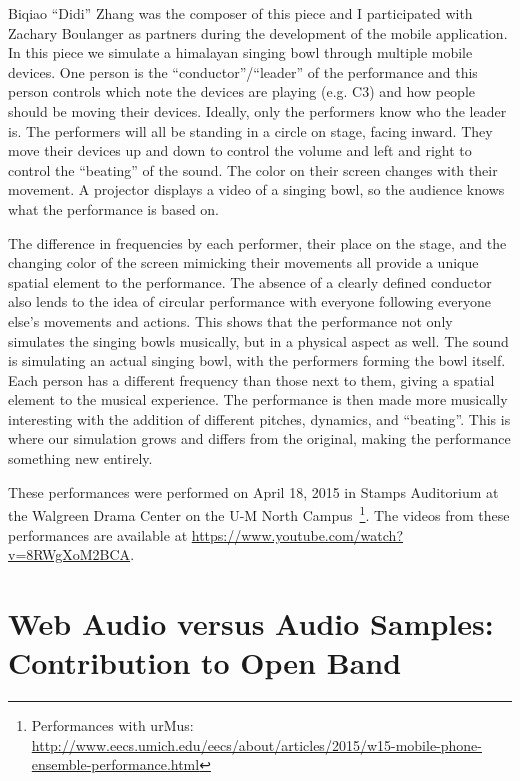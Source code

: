 Biqiao ``Didi'' Zhang was the composer of this piece and I participated with Zachary Boulanger as partners during the development of the mobile application.  
In this piece we simulate a himalayan singing bowl through multiple mobile devices. 
One person is the ``conductor''/``leader'' of the performance and this person controls which note the devices are playing (e.g. C3) and how people should be moving their devices. 
Ideally, only the performers know who the leader is.
The performers will all be standing in a circle on stage, facing inward. 
They move their devices up and down to control the volume and left and right to control the ``beating'' of the sound. 
The color on their screen changes with their movement. 
A projector displays a video of a singing bowl, so the audience knows what the performance is based on.

The difference in frequencies by each performer, their place on the stage, and the changing color of the screen mimicking their movements all provide a unique spatial element to the performance. 
The absence of a clearly defined conductor also lends to the idea of circular performance with everyone following everyone else’s movements and actions. 
This shows that the performance not only simulates the singing bowls musically, but in a physical aspect as well.
The sound is simulating an actual singing bowl, with the performers forming the bowl itself. 
Each person has a different frequency than those next to them, giving a spatial element to the musical experience. 
The performance is then made more musically interesting with the addition of different pitches, dynamics, and ``beating''. 
This is where our simulation grows and differs from the original, making the performance something new entirely.

These performances were performed on April 18, 2015 in Stamps Auditorium at the Walgreen Drama Center on the U-M North Campus~\footnote{Performances with urMus: \url{http://www.eecs.umich.edu/eecs/about/articles/2015/w15-mobile-phone-ensemble-performance.html}}.
The videos from these performances are available at \url{https://www.youtube.com/watch?v=8RWgXoM2BCA}.


\section{Web Audio versus Audio Samples: Contribution to Open Band}
\label{sec:appbandaaberta}

